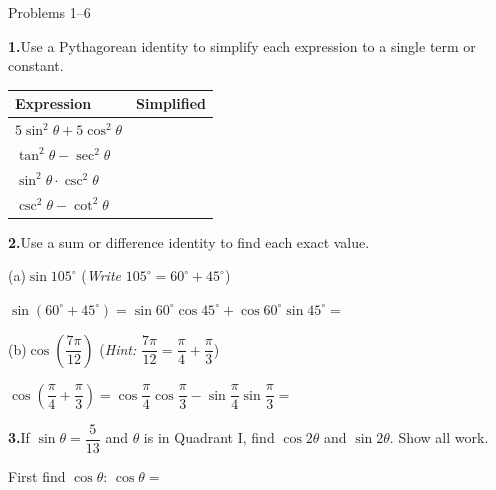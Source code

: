 \documentclass[10pt]{article}
\begin{document}
\namedateperiod

\vspace{0.10in}

\begin{notesbox}{Problems 1--6}

\textbf{1.}\quad Use a Pythagorean identity to simplify each expression to
a single term or constant.

\vspace{4pt}
\renewcommand{\arraystretch}{1.6}
\begin{tabular}{|l|c|}
\hline
\textbf{Expression} & \textbf{Simplified} \\
\hline
$5\sin^2\theta + 5\cos^2\theta$ & \\
\hline
$\tan^2\theta - \sec^2\theta$ & \\
\hline
$\sin^2\theta\cdot\csc^2\theta$ & \\
\hline
$\csc^2\theta - \cot^2\theta$ & \\
\hline
\end{tabular}

\vspace{0.14in}
\textbf{2.}\quad Use a sum or difference identity to find each exact value.

\vspace{4pt}
(a)\quad $\sin 105^\circ$
\hspace{0.6cm}(\textit{Write} $105^\circ = 60^\circ + 45^\circ$)

\vspace{4pt}
$\sin(60^\circ + 45^\circ)
= \sin 60^\circ \cos 45^\circ + \cos 60^\circ \sin 45^\circ
= $ \underline{\hspace{5cm}}

\vspace{8pt}
(b)\quad $\cos\!\left(\dfrac{7\pi}{12}\right)$
\hspace{0.6cm}(\textit{Hint:} $\dfrac{7\pi}{12} = \dfrac{\pi}{4} + \dfrac{\pi}{3}$)

\vspace{4pt}
$\cos\!\left(\dfrac{\pi}{4} + \dfrac{\pi}{3}\right)
= \cos\dfrac{\pi}{4}\cos\dfrac{\pi}{3} - \sin\dfrac{\pi}{4}\sin\dfrac{\pi}{3}
= $ \underline{\hspace{4cm}}

\vspace{0.14in}
\textbf{3.}\quad If $\sin\theta = \dfrac{5}{13}$ and $\theta$ is in Quadrant I, find $\cos 2\theta$
and $\sin 2\theta$. Show all work.

\vspace{4pt}
First find $\cos\theta$: $\cos\theta = $ \underline{\hspace{2.5cm}}


\end{notesbox}
\end{document}

